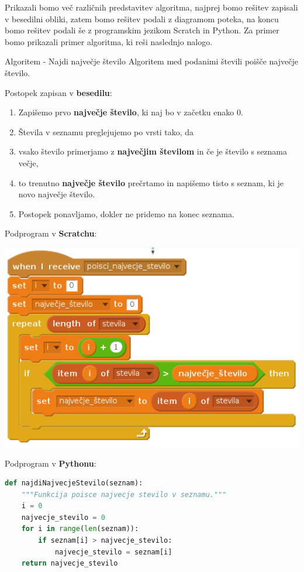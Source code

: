 Prikazali bomo več različnih predstavitev algoritma, najprej bomo
rešitev zapisali v besedilni obliki, zatem bomo rešitev podali z
diagramom poteka, na koncu bomo rešitev podali še z programskim
jezikom Scratch in Python.  Za primer bomo prikazali primer algoritma,
ki reši naslednjo nalogo.



\begin{examplebox}[label={prog:al01}]{Algoritem - Najdi največje število}
Algoritem med podanimi števili poišče največje število.

Postopek zapisan v \textbf{besedilu}:
\begin{enumerate}
\tightlist
\item Zapišemo prvo \textbf{največje število}, ki naj bo v začetku enako $0$. 
\item Števila v seznamu preglejujemo po vrsti tako, da
\item vsako število primerjamo z \textbf{največjim številom} in če je število s
  seznama večje, 
\item to trenutno \textbf{največje število} prečrtamo in napišemo
  tisto s seznam, ki je novo največje število.
\item Postopek ponavljamo, dokler ne pridemo na konec seznama.
\end{enumerate}


Podprogram v \textbf{Scratchu}:

    \includegraphics [width=0.6\linewidth, keepaspectratio =
    1] {./images/scratchImg/01-Scr_Alg-NajvecjeSt-img_trs.png}

Podprogram v \textbf{Pythonu}:

\begin{lstlisting}[language=Python]
def najdiNajvecjeStevilo(seznam):
    """Funkcija poisce najvecje stevilo v seznamu."""
    i = 0
    najvecje_stevilo = 0
    for i in range(len(seznam)):
        if seznam[i] > najvecje_stevilo:
            najvecje_stevilo = seznam[i]
    return najvecje_stevilo
\end{lstlisting}
\end{examplebox}

